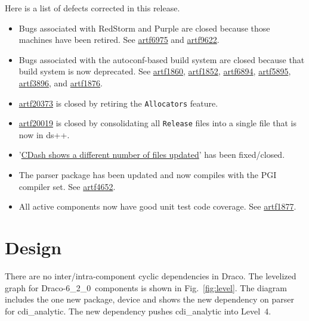 \documentclass[note]{ResearchNote_pdf}
\newcommand{\draco}{Draco}
\newcommand{\dracor}{\draco-6\_2\_0}
\begin{document}
\noindent Here is a list of defects corrected in this release.
\begin{itemize}
\item Bugs associated with RedStorm and Purple are closed because those machines
  have been retired. See
  \href{https://tf.lanl.gov/sf/sfmain/do/go/artf6975}{artf6975} and
  \href{https://tf.lanl.gov/sf/sfmain/do/go/artf9622}{artf9622}. 
\item Bugs associated with the autoconf-based build system are
  closed because that build system is now deprecated. See
  \href{https://tf.lanl.gov/sf/sfmain/do/go/artf1860}{artf1860},
  \href{https://tf.lanl.gov/sf/sfmain/do/go/artf1852}{artf1852},
  \href{https://tf.lanl.gov/sf/sfmain/do/go/artf6894}{artf6894},
  \href{https://tf.lanl.gov/sf/sfmain/do/go/artf5895}{artf5895},
  \href{https://tf.lanl.gov/sf/sfmain/do/go/artf3896}{artf3896}, and
  \href{https://tf.lanl.gov/sf/sfmain/do/go/artf1876}{artf1876}.
\item \href{https://tf.lanl.gov/sf/sfmain/do/go/artf20373}{artf20373}
  is closed by retiring the \texttt{Allocators} feature.
\item \href{https://tf.lanl.gov/sf/sfmain/do/go/artf20019}{artf20019}
  is closed by consolidating all \texttt{Release} files into a single
  file that is now in ds++.
\item '\href{https://tf.lanl.gov/sf/sfmain/do/go/artf20183}{CDash
  shows a different number of files updated}' has been fixed/closed.
\item The parser package has been updated and now compiles with the
  PGI compiler set. See
  \href{https://tf.lanl.gov/sf/sfmain/do/go/artf4652}{artf4652}.
\item All active components now have good unit test code coverage. See
  \href{https://tf.lanl.gov/sf/sfmain/do/go/artf1877}{artf1877}. 
\end{itemize}


\section{Design}

There are no inter/intra-component cyclic dependencies in \draco.  The
levelized graph for \dracor\ components is shown in
Fig.~\ref{fig:level}.  The diagram includes the one new package,
\textsf{device} and shows the new dependency on \textsf{parser} for
\textsf{cdi\_analytic}. The new dependency pushes
\textsf{cdi\_analytic} into Level~4.
\end{document}
